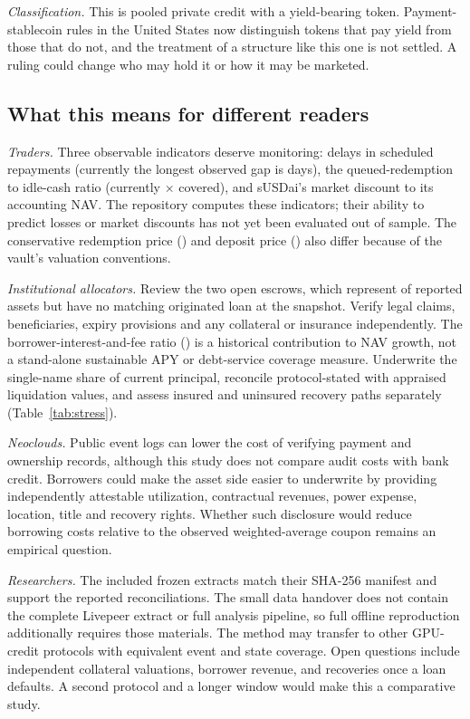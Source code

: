 \emph{Classification.} This is pooled private credit with a yield-bearing token. Payment-stablecoin rules in the United States now distinguish tokens that pay yield from those that do not, and the treatment of a structure like this one is not settled. A ruling could change who may hold it or how it may be marketed.

\subsection{What this means for different readers}
\emph{Traders.} Three observable indicators deserve monitoring: delays in scheduled repayments (currently the longest observed gap is \MaxDaysSincePayment{} days), the queued-redemption to idle-cash ratio (currently \IdleOverPending{}$\times$ covered), and sUSDai's market discount to its accounting NAV. The repository computes these indicators; their ability to predict losses or market discounts has not yet been evaluated out of sample. The conservative redemption price (\RedemptionPrice{}) and deposit price (\DepositPrice{}) also differ because of the vault's valuation conventions.

\emph{Institutional allocators.} Review the two open escrows, which represent \DTShare{} of reported assets but have no matching originated loan at the snapshot. Verify legal claims, beneficiaries, expiry provisions and any collateral or insurance independently. The borrower-interest-and-fee ratio (\KappaBorrowers{}) is a historical contribution to NAV growth, not a stand-alone sustainable APY or debt-service coverage measure. Underwrite the \TopOneOut{} single-name share of current principal, reconcile protocol-stated \BookLTV{} with appraised liquidation values, and assess insured and uninsured recovery paths separately (Table~\ref{tab:stress}).

\emph{Neoclouds.} Public event logs can lower the cost of verifying payment and ownership records, although this study does not compare audit costs with bank credit. Borrowers could make the asset side easier to underwrite by providing independently attestable utilization, contractual revenues, power expense, location, title and recovery rights. Whether such disclosure would reduce borrowing costs relative to the observed \RateWavg{} weighted-average coupon remains an empirical question.

\emph{Researchers.} The included frozen extracts match their SHA-256 manifest and support the reported reconciliations. The small data handover does not contain the complete Livepeer extract or full analysis pipeline, so full offline reproduction additionally requires those materials. The method may transfer to other GPU-credit protocols with equivalent event and state coverage. Open questions include independent collateral valuations, borrower revenue, and recoveries once a loan defaults. A second protocol and a longer window would make this a comparative study.

